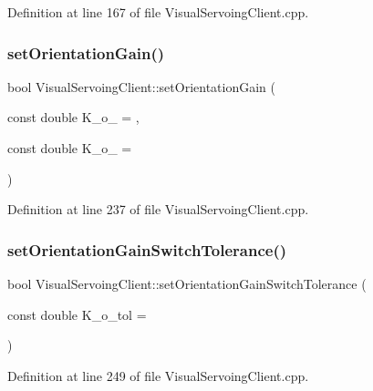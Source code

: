 Definition at line 167 of file Visual\+Servoing\+Client.\+cpp.

\mbox{\label{classVisualServoingClient_a3df91c530a6aec77e9fd6d418ba3efaf}} 
\subsubsection{\texorpdfstring{set\+Orientation\+Gain()}{setOrientationGain()}}
{\footnotesize\ttfamily bool Visual\+Servoing\+Client\+::set\+Orientation\+Gain (\begin{DoxyParamCaption}\item[{const double}]{K\+\_\+o\+\_ = {},  }\item[{const double}]{K\+\_\+o\+\_ = {} }\end{DoxyParamCaption})\hspace{0.3cm}{\ttfamily [override]}}



Definition at line 237 of file Visual\+Servoing\+Client.\+cpp.

\mbox{\label{classVisualServoingClient_acaa5865c6709780f9c6ea6d31687ac2e}} 
\subsubsection{\texorpdfstring{set\+Orientation\+Gain\+Switch\+Tolerance()}{setOrientationGainSwitchTolerance()}}
{\footnotesize\ttfamily bool Visual\+Servoing\+Client\+::set\+Orientation\+Gain\+Switch\+Tolerance (\begin{DoxyParamCaption}\item[{const double}]{K\+\_\+o\+\_\+tol = {} }\end{DoxyParamCaption})\hspace{0.3cm}{\ttfamily [override]}}



Definition at line 249 of file Visual\+Servoing\+Client.\+cpp.

